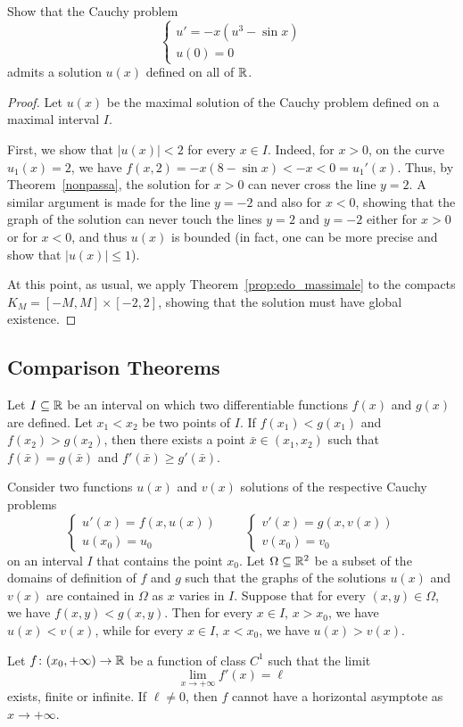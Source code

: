 \begin{example}
Show that the Cauchy problem
\[
\begin{cases}
	u' = -x(u^3 - \sin x) \\
	u(0) = 0
\end{cases}
\]
admits a solution $u(x)$ defined on all of ${\mathbb R}$.
\end{example}
%
\begin{proof}
Let $u(x)$ be the maximal solution of the Cauchy problem defined on a maximal
interval $I$.

First, we show that $\vert u(x) \vert < 2$ for every $x\in I$. Indeed, for
$x>0$, on the curve $u_1(x)=2$, we have $f(x,2) = -x (8-\sin x) < -x < 0 =
u_1'(x)$. Thus, by Theorem~\ref{nonpassa}, the solution for $x>0$ can never
cross the line $y=2$. A similar argument is made for the line $y=-2$ and also
for $x<0$, showing that the graph of the solution can never touch the lines
$y=2$ and $y=-2$ either for $x>0$ or for $x<0$, and thus $u(x)$ is bounded (in
fact, one can be more precise and show that $\vert u(x)\vert \le 1$).

At this point, as usual, we apply Theorem~\ref{prop:edo_massimale} to the
compacts $K_M=[-M,M]\times[-2,2]$, showing that the solution must have global
existence.
\end{proof}

\subsection{Comparison Theorems}

\begin{theorem}
Let $I\subseteq {\mathbb R}$ be an interval on which two differentiable functions $f(x)$
and $g(x)$ are defined. Let $x_1<x_2$ be two points of $I$. If $f(x_1)<g(x_1)$
and $f(x_2)>g(x_2)$, then there exists a point $\bar x \in (x_1,x_2)$ such that
$f(\bar x)=g(\bar x)$ and $f'(\bar x)\ge g'(\bar x)$.
\end{theorem}

\begin{theorem}
Consider two functions $u(x)$ and $v(x)$ solutions of the respective Cauchy
problems
\[
\begin{cases}
  u'(x)  = f(x,u(x))\\
  u(x_0) = u_0
\end{cases}
\qquad
\begin{cases}
  v'(x) = g(x,v(x))\\
  v(x_0) = v_0
\end{cases}
\]
on an interval $I$ that contains the point $x_0$. Let $\Omega\subseteq {\mathbb R}^2$ be a
subset of the domains of definition of $f$ and $g$ such that the graphs of the
solutions $u(x)$ and $v(x)$ are contained in $\Omega$ as $x$ varies in $I$.
Suppose that for every $(x,y)\in\Omega$, we have $f(x,y)<g(x,y)$. Then for every
$x\in I$, $x> x_0$, we have $u(x)< v(x)$, while for every $x\in I$, $x<x_0$, we
have $u(x)>v(x)$.
\end{theorem}

\begin{theorem}
Let $f\colon (x_0,+\infty)\to {\mathbb R}$ be a function of class $C^1$ such that the
limit
\[
  \lim_{x\to +\infty} f'(x) = \ell
\]
exists, finite or infinite. If $\ell\neq 0$, then $f$ cannot have a horizontal
asymptote as $x\to +\infty$.
\end{theorem}